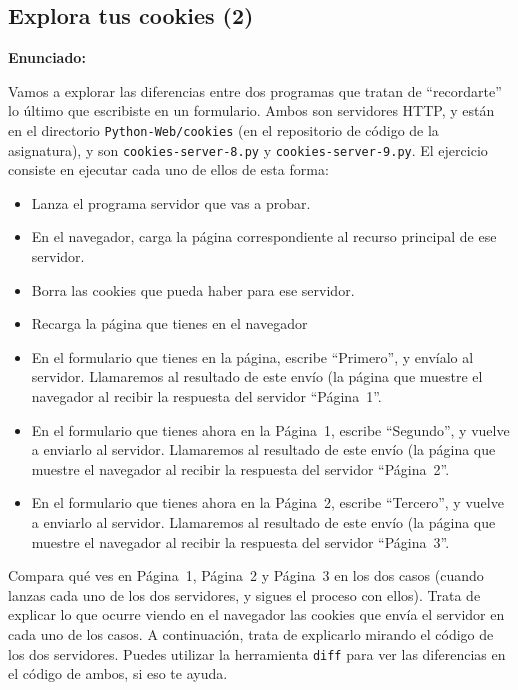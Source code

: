 \subsection{Explora tus cookies (2)}
\label{subsec:explora-cookies-2}

\textbf{Enunciado:}

Vamos a explorar las diferencias entre dos programas que tratan de ``recordarte'' lo último que escribiste en un formulario. Ambos son servidores HTTP, y están en el directorio \verb|Python-Web/cookies| (en el repositorio de código de la asignatura), y son \verb|cookies-server-8.py| y \verb|cookies-server-9.py|. El ejercicio consiste en ejecutar cada uno de ellos de esta forma:

\begin{itemize}
\item Lanza el programa servidor que vas a probar.
\item En el navegador, carga la página correspondiente al recurso principal de ese servidor.
\item Borra las cookies que pueda haber para ese servidor.
\item Recarga la página que tienes en el navegador
\item En el formulario que tienes en la página, escribe ``Primero'', y envíalo al servidor. Llamaremos al resultado de este envío (la página que muestre el navegador al recibir la respuesta del servidor ``Página~1''.
\item En el formulario que tienes ahora en la Página~1, escribe ``Segundo'', y vuelve a enviarlo al servidor. Llamaremos al resultado de este envío (la página que muestre el navegador al recibir la respuesta del servidor ``Página~2''.
\item En el formulario que tienes ahora en la Página~2, escribe ``Tercero'', y vuelve a enviarlo al servidor. Llamaremos al resultado de este envío (la página que muestre el navegador al recibir la respuesta del servidor ``Página~3''.
\end{itemize}

Compara qué ves en Página~1, Página~2 y Página~3 en los dos casos (cuando lanzas cada uno de los dos servidores, y sigues el proceso con ellos). Trata de explicar lo que ocurre viendo en el navegador las cookies que envía el servidor en cada uno de los casos. A continuación, trata de explicarlo mirando el código de los dos servidores. Puedes utilizar la herramienta \verb|diff| para ver las diferencias en el código de ambos, si eso te ayuda.

